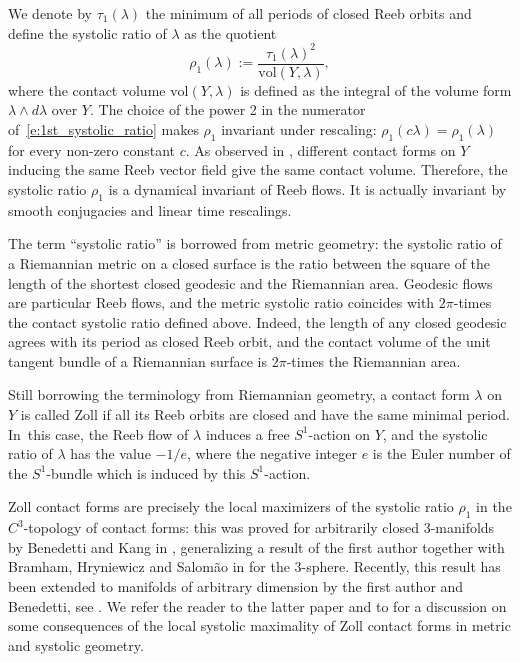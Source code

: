 \documentclass[JEP,XML,SOM,Unicode,published]{cedram}
\theoremstyle{definition}
\newcommand{\vol}{\mathrm{vol}}
\let\eul e
\let\diff d
\begin{document}
We denote by $\tau_1(\lambda)$ the minimum of all periods of closed Reeb orbits and define the systolic ratio of $\lambda$ as the quotient
\begin{equation}
\label{e:1st_systolic_ratio}
\rho_1(\lambda) := \frac{\tau_1(\lambda)^2}{\vol(Y,\lambda)},
\end{equation}
where the contact volume $\vol(Y,\lambda)$ is defined as the integral of the volume form $\lambda\wedge \diff\lambda$ over $Y$. The choice of the power 2 in the numerator of~\eqref{e:1st_systolic_ratio} makes $\rho_1$ invariant under rescaling: $\rho_1(c\lambda) = \rho_1(\lambda)$ for every non-zero constant $c$. As observed in \cite[Lem.\,2.1]{Croke:1994}, different contact forms on $Y$ inducing the same Reeb vector field give the same contact volume. Therefore, the systolic ratio $\rho_1$ is a dynamical invariant of Reeb flows. It is actually invariant by smooth conjugacies and linear time rescalings.

The term ``systolic ratio'' is borrowed from metric geometry: the systolic ratio of a Riemannian metric on a closed surface is the ratio between the square of the length of the shortest closed geodesic and the Riemannian area. Geodesic flows are particular Reeb flows, and the metric systolic ratio coincides with $2\pi$-times the contact systolic ratio defined above. Indeed, the length of any closed geodesic agrees with its period as closed Reeb orbit, and the contact volume of the unit tangent bundle of a Riemannian surface is $2\pi$-times the Riemannian area.

Still borrowing the terminology from Riemannian geometry, a contact form $\lambda$ on~$Y$ is called Zoll if all its Reeb orbits are closed and have the same minimal period. In~this case, the Reeb flow of $\lambda$ induces a free $S^1$-action on $Y$, and the systolic ratio of $\lambda$ has the value $-1/\eul$, where the negative integer $\eul$ is the Euler number of the $S^1$-bundle which is induced by this $S^1$-action.

Zoll contact forms are precisely the local maximizers of the systolic ratio $\rho_1$ in the $C^3$-topology of contact forms: this was proved for arbitrarily closed $3$-manifolds by Benedetti and Kang in \cite{Benedetti:2021aa}, generalizing a result of the first author together with Bramham, Hryniewicz and Salom\~ao in \cite{Abbondandolo:2018fb} for the 3-sphere. Recently, this result has been extended to manifolds of arbitrary dimension by the first author and Benedetti, see \cite{Abbondandolo:2019tl}. We refer the reader to the latter paper and to \cite{Alvarez-Paiva:2014uq} for a discussion on some consequences of the local systolic maximality of Zoll contact forms in metric and systolic geometry.
\end{document}
